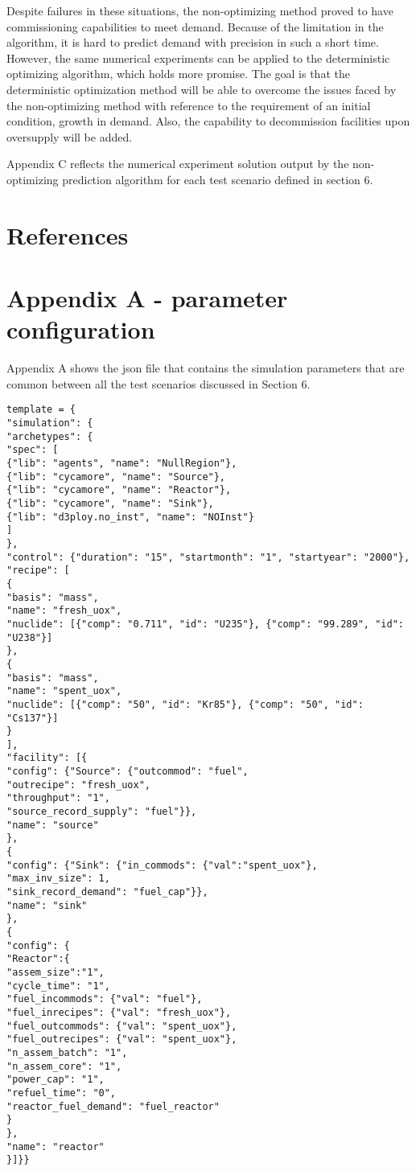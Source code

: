 \documentclass[11pt,letterpaper]{article}
\begin{document}
Despite failures in these situations, the non-optimizing method proved to have commissioning capabilities
to meet demand. Because of the limitation in the algorithm, it is hard to predict demand with precision
in such a short time. However, the same numerical experiments can be applied to the deterministic
optimizing algorithm, which holds more promise. The goal is that the deterministic optimization method
will be able to overcome the issues faced by the non-optimizing method with reference to the
requirement of an initial condition, growth in demand. Also, the capability to decommission facilities
upon oversupply will be added.

Appendix C reflects the numerical experiment solution output by the non-optimizing prediction algorithm for each test scenario defined in section 6. 

\pagebreak

\section{References}


\pagebreak

\section*{Appendix A - parameter configuration}
Appendix A shows the json file that contains the simulation parameters that are common between all the test scenarios discussed in Section 6.  

\begin{verbatim}
template = {
"simulation": {
"archetypes": {
"spec": [
{"lib": "agents", "name": "NullRegion"}, 
{"lib": "cycamore", "name": "Source"}, 
{"lib": "cycamore", "name": "Reactor"},
{"lib": "cycamore", "name": "Sink"},
{"lib": "d3ploy.no_inst", "name": "NOInst"}
]
}, 
"control": {"duration": "15", "startmonth": "1", "startyear": "2000"}, 
"recipe": [
{
"basis": "mass", 
"name": "fresh_uox", 
"nuclide": [{"comp": "0.711", "id": "U235"}, {"comp": "99.289", "id": "U238"}]
}, 
{
"basis": "mass", 
"name": "spent_uox", 
"nuclide": [{"comp": "50", "id": "Kr85"}, {"comp": "50", "id": "Cs137"}]
}
], 
"facility": [{
"config": {"Source": {"outcommod": "fuel",
"outrecipe": "fresh_uox",
"throughput": "1",
"source_record_supply": "fuel"}}, 
"name": "source"
},
{
"config": {"Sink": {"in_commods": {"val":"spent_uox"},
"max_inv_size": 1,
"sink_record_demand": "fuel_cap"}}, 
"name": "sink"
},
{
"config": {
"Reactor":{
"assem_size":"1",
"cycle_time": "1", 
"fuel_incommods": {"val": "fuel"}, 
"fuel_inrecipes": {"val": "fresh_uox"}, 
"fuel_outcommods": {"val": "spent_uox"}, 
"fuel_outrecipes": {"val": "spent_uox"}, 
"n_assem_batch": "1", 
"n_assem_core": "1", 
"power_cap": "1", 
"refuel_time": "0",
"reactor_fuel_demand": "fuel_reactor"
}
},
"name": "reactor"
}]}}
\end{verbatim}
\end{document}

